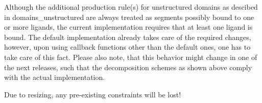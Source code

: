 
\begin{DoxyRefList}
\item[\label{bug__bug000002}%
\Hypertarget{bug__bug000002}%
Module \mbox{\hyperlink{group__domains__up}{domains\+\_\+up}} ]Although the additional production rule(s) for unstructured domains as descibed in domains\+\_\+unstructured are always treated as \textquotesingle{}segments possibly bound to one or more ligands\textquotesingle{}, the current implementation requires that at least one ligand is bound. The default implementation already takes care of the required changes, however, upon using callback functions other than the default ones, one has to take care of this fact. Please also note, that this behavior might change in one of the next releases, such that the decomposition schemes as shown above comply with the actual implementation. 
\item[\label{bug__bug000001}%
\Hypertarget{bug__bug000001}%
Global \mbox{\hyperlink{group__subopt__zuker_gababde9d210eb433854f1e71da7815fbb}{vrna\+\_\+subopt\+\_\+zuker}} (vrna\+\_\+fold\+\_\+compound\+\_\+t $\ast$vc)]Due to resizing, any pre-\/existing constraints will be lost!
\end{DoxyRefList}